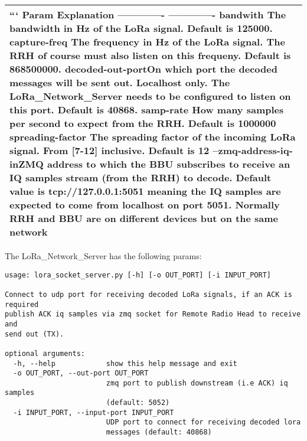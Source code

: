\begin{longtable}[]{@{}l@{}}
\begin{minipage}[t]{0.04\columnwidth}\raggedright\strut
``` \textbar{} Param \textbar{} Explanation \textbar{} \textbar{}
------------- \textbar{} ------------- \textbar{} \textbar{} bandwith
\textbar{} The bandwidth in Hz of the LoRa signal. Default is 125000.
\textbar{} \textbar{} capture-freq \textbar{} The frequency in Hz of the
LoRa signal. The RRH of course must also listen on this frequeny.
Default is 868500000. \textbar{} \textbar{}decoded-out-port\textbar{}On
which port the decoded messages will be sent out. Localhost only. The
LoRa\_Network\_Server needs to be configured to listen on this port.
Default is 40868.\textbar{} \textbar{}samp-rate\textbar{} How many
samples per second to expect from the RRH. Default is 1000000\textbar{}
\textbar{}spreading-factor\textbar{} The spreading factor of the
incoming LoRa signal. From {[}7-12{]} inclusive. Default is 12
\textbar{} \textbar{}--zmq-address-iq-in\textbar{}ZMQ address to which
the BBU subscribes to receive an IQ samples stream (from the RRH) to
decode. Default value is tcp://127.0.0.1:5051 meaning the IQ samples are
expected to come from localhost on port 5051. Normally RRH and BBU are
on different devices but on the same network\textbar{}\strut
\end{minipage}\tabularnewline
\bottomrule
\end{longtable}

The LoRa\_Network\_Server has the following params:

\begin{verbatim}
usage: lora_socket_server.py [-h] [-o OUT_PORT] [-i INPUT_PORT]

Connect to udp port for receiving decoded LoRa signals, if an ACK is required
publish ACK iq samples via zmq socket for Remote Radio Head to receive and
send out (TX).

optional arguments:
  -h, --help            show this help message and exit
  -o OUT_PORT, --out-port OUT_PORT
                        zmq port to publish downstream (i.e ACK) iq samples
                        (default: 5052)
  -i INPUT_PORT, --input-port INPUT_PORT
                        UDP port to connect for receiving decoded lora
                        messages (default: 40868)

\end{verbatim}


